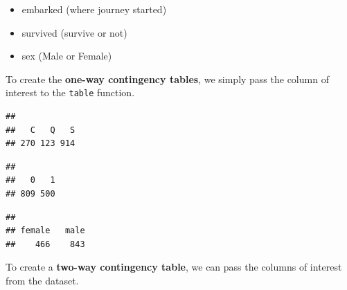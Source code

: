 \documentclass[
]{book}
\newenvironment{Shaded}{\begin{snugshade}}{\end{snugshade}}
\newcommand{\KeywordTok}[1]{\textcolor[rgb]{0.13,0.29,0.53}{\textbf{#1}}}
\newcommand{\NormalTok}[1]{#1}
\newcommand{\OperatorTok}[1]{\textcolor[rgb]{0.81,0.36,0.00}{\textbf{#1}}}
\providecommand{\tightlist}{%
  \setlength{\itemsep}{0pt}\setlength{\parskip}{0pt}}
\theoremstyle{definition}
\theoremstyle{definition}
\theoremstyle{definition}
\theoremstyle{remark}
\begin{document}
\begin{itemize}
\tightlist
\item
  embarked (where journey started)\\
\item
  survived (survive or not)\\
\item
  sex (Male or Female)
\end{itemize}

To create the \textbf{one-way contingency tables}, we simply pass the column of interest to the \texttt{table} function.

\begin{Shaded}
\end{Shaded}

\begin{verbatim}
## 
##   C   Q   S 
## 270 123 914
\end{verbatim}

\begin{Shaded}
\end{Shaded}

\begin{verbatim}
## 
##   0   1 
## 809 500
\end{verbatim}

\begin{Shaded}
\end{Shaded}

\begin{verbatim}
## 
## female   male 
##    466    843
\end{verbatim}

To create a \textbf{two-way contingency table}, we can pass the columns of interest from the dataset.

\begin{Shaded}
\end{Shaded}
\end{document}

